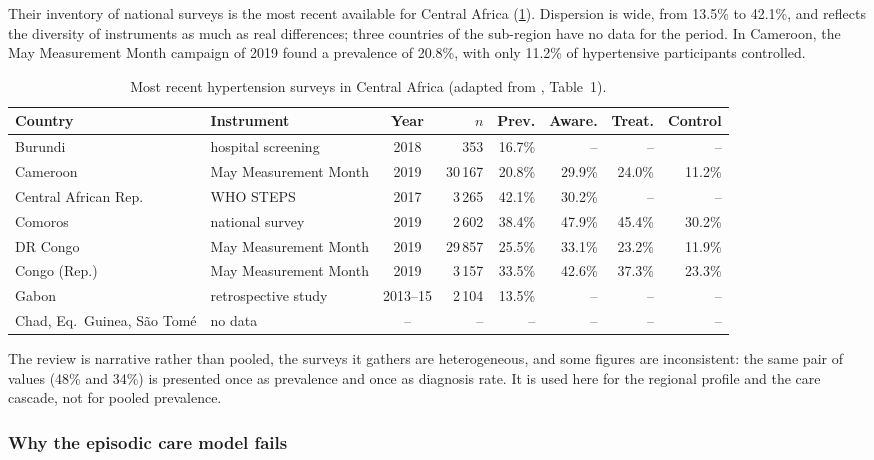 Their inventory of national surveys is the most recent available for Central Africa (\cref{tab:central-africa}). Dispersion is wide, from 13.5\% to 42.1\%, and reflects the diversity of instruments as much as real differences; three countries of the sub-region have no data for the period. In Cameroon, the May Measurement Month campaign of 2019 found a prevalence of 20.8\%, with only 11.2\% of hypertensive participants controlled.

\begin{table}[htbp]
\centering\footnotesize
\caption{Most recent hypertension surveys in Central Africa (adapted from \cite{gafane2024}, Table~1).}\label{tab:central-africa}
\begin{tabularx}{\textwidth}{@{}l >{\raggedright\arraybackslash}X c r r r r r@{}}
\toprule
\textbf{Country} & \textbf{Instrument} & \textbf{Year} & \textbf{$n$} & \textbf{Prev.} & \textbf{Aware.} & \textbf{Treat.} & \textbf{Control} \\
\midrule
Burundi & hospital screening & 2018 & 353 & 16.7\% & -- & -- & -- \\
Cameroon & May Measurement Month & 2019 & 30\,167 & 20.8\% & 29.9\% & 24.0\% & 11.2\% \\
Central African Rep. & WHO STEPS & 2017 & 3\,265 & 42.1\% & 30.2\% & -- & -- \\
Comoros & national survey & 2019 & 2\,602 & 38.4\% & 47.9\% & 45.4\% & 30.2\% \\
DR Congo & May Measurement Month & 2019 & 29\,857 & 25.5\% & 33.1\% & 23.2\% & 11.9\% \\
Congo (Rep.) & May Measurement Month & 2019 & 3\,157 & 33.5\% & 42.6\% & 37.3\% & 23.3\% \\
Gabon & retrospective study & 2013--15 & 2\,104 & 13.5\% & -- & -- & -- \\
Chad, Eq.\ Guinea, S\~ao Tom\'e & no data & -- & -- & -- & -- & -- & -- \\
\bottomrule
\end{tabularx}
\end{table}

The review is narrative rather than pooled, the surveys it gathers are heterogeneous, and some figures are inconsistent: the same pair of values (48\% and 34\%) is presented once as prevalence and once as diagnosis rate. It is used here for the regional profile and the care cascade, not for pooled prevalence.

\subsubsection{Why the episodic care model fails}\label{sec:ltfu}\label{sec:inertia}\label{sec:time}\label{sec:records}

